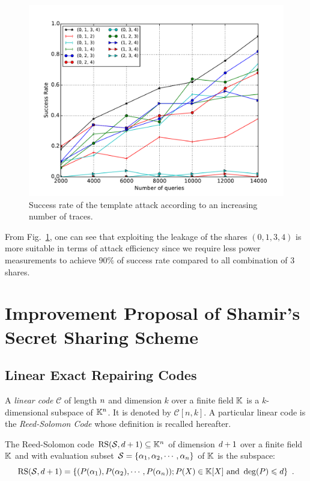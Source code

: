 \documentclass{llncs}
\begin{document}
\begin{figure}
\begin{center}
\includegraphics[width=1\textwidth]{Figure/SR.pdf}
\caption{Success rate of the template attack according to an increasing number of traces.}
\label{fig_SR}
\end{center}
\end{figure}

From Fig.~\ref{fig_SR}, one can see that exploiting the leakage of the shares $(0, 1, 3, 4)$ is more suitable in terms of attack efficiency since we require less power measurements to achieve $90\%$ of success rate compared to all combination of $3$ shares. 



\section{Improvement Proposal of Shamir's Secret Sharing Scheme}

\subsection{Linear Exact Repairing Codes}

A {\em linear code} $\mathcal{C}$ of length $\nbShares$ and dimension $k$ over a finite field $\Field$ is a $k$-dimensional subspace of $\Field^{\nbShares}$. It is denoted by $\mathcal{C}[n,k]$. A particular linear code is the {\em Reed-Solomon Code} whose definition is recalled hereafter.

\begin{definition}
The Reed-Solomon code $\RS[\pubSet, \order + 1]\subseteq \Field^{\nbShares}$ of dimension $\order + 1$ over a finite field $\Field$ and with evaluation subset $\pubSet = \{\pubElt[1],\pubElt[2],\cdots,\pubElt[\nbShares]\}$ of $\Field$ is the subspace:
$$\RS[\pubSet,\order + 1] = \{(P(\pubElt[1]),P(\pubElt[2]),\cdots,P(\pubElt[\nbShares])); P(X) \in \Field[X] \text{ and } \deg(P) \leqslant \order\} \enspace .$$
\end{definition}
\end{document}
